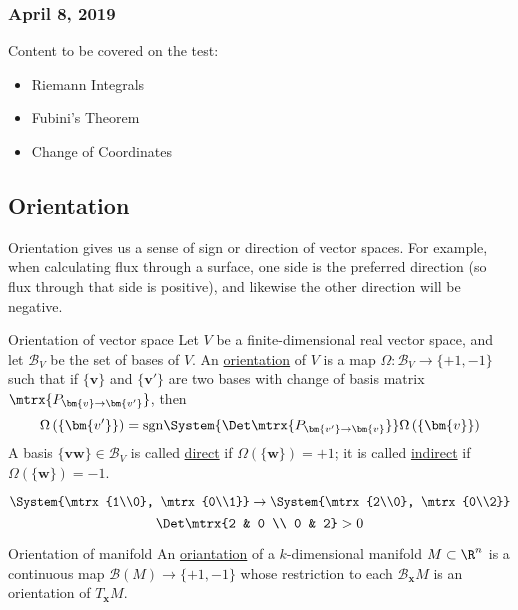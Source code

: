 \subsubsection*{April 8, 2019}

Content to be covered on the test: 
\begin{itemize}
	\item Riemann Integrals
	\item Fubini's Theorem
	\item Change of Coordinates
\end{itemize}

\subsection{Orientation}
Orientation gives us a sense of sign or direction of vector spaces. For example, when calculating flux through a surface, one side is the preferred direction (so flux through that side is positive), and likewise the other direction will be negative. 
\begin{defn}{Orientation of vector space}
	Let $V$ be a finite-dimensional real vector space, and let $\mathcal{B}_V$ be the set of bases of $V$. An \ul{orientation} of $V$ is a map $\Omega : \mathcal{B}_V \to \{+1, -1\}$ such that if $\{\bm{v}\}$ and $\{\bm{v'}\}$ are two bases with change of basis matrix $\mtrx{P_{\bm{v}\to \bm{v'}}}$, then
	\begin{equation}
		\Omega\left(\{\bm{v'}\}\right) = \mathrm{sgn}\System{\Det \mtrx{P_{\bm{v'}\to \bm{v}}}}\Omega\left(\{\bm{v}\}\right)
	\end{equation}
	A basis $\{\bm{vw}\}\in\mathcal{B}_V$ is called \ul{direct} if $\Omega\left(\{\bm{w}\}\right)=+1$; it is called \ul{indirect} if $\Omega\left(\{\bm{w}\}\right)=-1$. 
\end{defn}

\example 
\[\System{\mtrx{1\\0}, \mtrx{0\\1}}\to \System{\mtrx{2\\0}, \mtrx{0\\2}}\]
\[\Det \mtrx{2 & 0 \\ 0 & 2} > 0\]

\begin{defn}{Orientation of manifold}
	An \ul{oriantation} of a $k$-dimensional manifold $M\subset \R^n$ is a continuous map $\mathcal{B}(M)\to \{+1,-1\}$ whose restriction to each $\mathcal{B}_{\bm{x}}M$ is an orientation of $T_{\bm{x}}M$. 
\end{defn}

